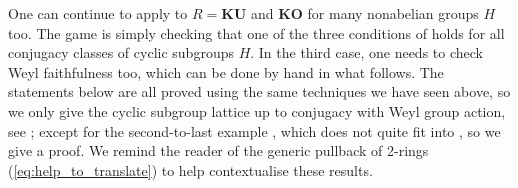 \documentclass[11pt, a4paper]{article}
\newcommand{\1}{\mathbf{1}}
\newcommand{\gKU}{{\mathbf{KU}}}
\newcommand{\gKO}{{\mathbf{KO}}}
\DeclareMathOperator{\Perf}{Perf}
\theoremstyle{plain}
\newtheorem{prop}[equation]{Proposition}
\theoremstyle{definition}
\theoremstyle{remark}\numberwithin{equation}{section}
\begin{document}
One can continue to apply  to $R=\gKU$ and $\gKO$ for many nonabelian groups $H$ too. The game is simply checking that one of the three conditions of  holds for all conjugacy classes of cyclic subgroups $H$. In the third case, one needs to check Weyl faithfulness too, which can be done by hand in what follows. The statements below are all proved using the same techniques we have seen above, so we only give the cyclic subgroup lattice up to conjugacy with Weyl group action, see ; except for the second-to-last example , which does not quite fit into , so we give a proof. We remind the reader of the generic pullback of 2-rings (\ref{eq:help_to_translate}) to help contextualise these results.



\end{document}
